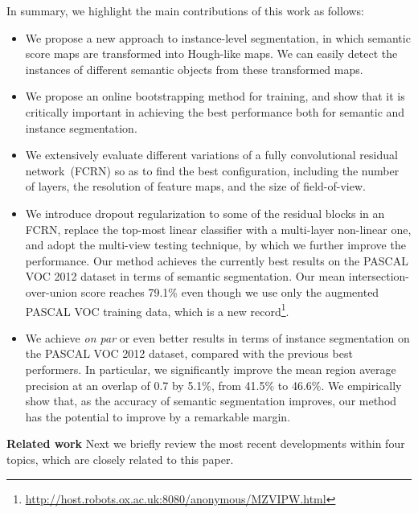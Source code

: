 \documentclass{article}
\begin{document}
In summary, we highlight the main contributions of this work as follows:
\vspace{-2.0mm}
\begin{itemize}
\item
We propose a new approach to instance-level segmentation, in which semantic score maps are transformed into Hough-like maps.
We can easily detect the instances of different semantic objects from these transformed maps.
\vspace{-1.0mm}
\item
We propose an online bootstrapping method for training,
and show that it is critically important in achieving the best performance both for semantic and instance segmentation.
\vspace{-1.0mm}
\item
We extensively evaluate different variations of a fully convolutional residual network~(FCRN) so as to find the best configuration,
including the number of layers, the resolution of feature maps, and the size of field-of-view.
\vspace{-1.0mm}
\item
We introduce dropout regularization to some of the residual blocks in an FCRN, replace the top-most linear classifier with a multi-layer non-linear one, and adopt the multi-view testing technique,
by which we further improve the performance.
Our method achieves the currently best results on the PASCAL VOC 2012 dataset in terms of semantic segmentation.
Our mean intersection-over-union score reaches 79.1\% even though we use only the augmented PASCAL VOC training data,
which is a new record\footnote{\url{http://host.robots.ox.ac.uk:8080/anonymous/MZVIPW.html}}.
\vspace{-1.0mm}
\item
We achieve \emph{on par} or even better results in terms of instance segmentation on the PASCAL VOC 2012 dataset, compared with the previous best performers.
In particular, we significantly improve the mean region average precision at an overlap of 0.7 by 5.1\%, from 41.5\% to 46.6\%.
We empirically show that, as the accuracy of semantic segmentation improves, our method has the potential to improve by a remarkable margin.
\end{itemize}







\textbf{Related work}
Next  we briefly review the most recent developments within four topics, which are closely related to this paper.
\end{document}
